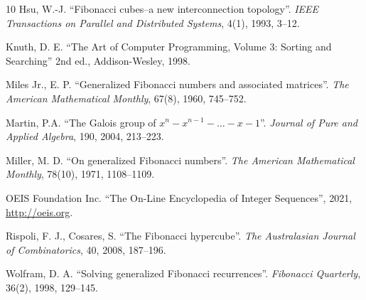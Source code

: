 \documentclass[a4paper,12pt]{article}
\theoremstyle{definition}
\begin{document}
\begin{thebibliography}{10}
  Hsu, W.-J. ``Fibonacci cubes--a new interconnection topology''.
  {\em IEEE Transactions on Parallel and Distributed Systems}, 4(1), 1993, 3--12.
   
  Knuth, D. E.
  ``The Art of Computer Programming, Volume 3: Sorting and Searching'' 2nd ed.,
  Addison-Wesley, 1998.
   
  Miles Jr., E. P.
  ``Generalized Fibonacci numbers and associated matrices''.
  {\em The American Mathematical Monthly}, 67(8), 1960, 745--752.

  Martin, P.A.
  ``The Galois group of $x^n - x^{n - 1} - \ldots - x - 1$''.
  {\em Journal of Pure and Applied Algebra}, 190, 2004, 213–223.
  
  Miller, M. D.
  ``On generalized Fibonacci numbers''.
  {\em The American Mathematical Monthly}, 78(10), 1971, 1108--1109.

  OEIS Foundation Inc.
  ``The On-Line Encyclopedia of Integer Sequences'', 2021,
  \url{http://oeis.org}.

  Rispoli, F. J., Cosares, S. ``The Fibonacci hypercube''.
  {\em The Australasian Journal of Combinatorics}, 40, 2008, 187--196.

    Wolfram, D. A.
    ``Solving generalized Fibonacci recurrences''.
    {\em Fibonacci Quarterly}, 36(2), 1998, 129--145.

\end{thebibliography}
\end{document}

